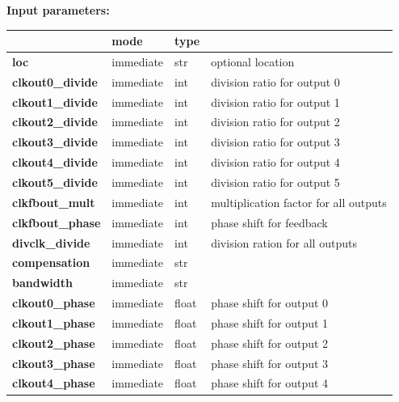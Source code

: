             {\bf Input parameters:} \\            
            \begin{tabular}{| l | l | l | l |}
            \hline
                           & mode  & type   & \\
            \hline \hline
            {\bf loc}                  & immediate & str   & optional location \\ \hline
            {\bf clkout0\_divide}      & immediate & int   & division ratio for output 0\\ \hline
            {\bf clkout1\_divide}      & immediate & int   & division ratio for output 1\\ \hline
            {\bf clkout2\_divide}      & immediate & int   & division ratio for output 2\\ \hline
            {\bf clkout3\_divide}      & immediate & int   & division ratio for output 3\\ \hline
            {\bf clkout4\_divide}      & immediate & int   & division ratio for output 4\\ \hline
            {\bf clkout5\_divide}      & immediate & int   & division ratio for output 5\\ \hline
            {\bf clkfbout\_mult}       & immediate & int   & multiplication factor for all outputs \\ \hline
            {\bf clkfbout\_phase}      & immediate & int   & phase shift for feedback \\ \hline
            {\bf divclk\_divide}       & immediate & int   & division ration for all outputs \\ \hline
            {\bf compensation}         & immediate & str   &             \\ \hline
            {\bf bandwidth}            & immediate & str   &             \\ \hline
            {\bf clkout0\_phase}       & immediate & float & phase shift for output 0 \\ \hline
            {\bf clkout1\_phase}       & immediate & float & phase shift for output 1 \\ \hline
            {\bf clkout2\_phase}       & immediate & float & phase shift for output 2 \\ \hline
            {\bf clkout3\_phase}       & immediate & float & phase shift for output 3 \\ \hline
            {\bf clkout4\_phase}       & immediate & float & phase shift for output 4 \\ \hline

\end{tabular}
